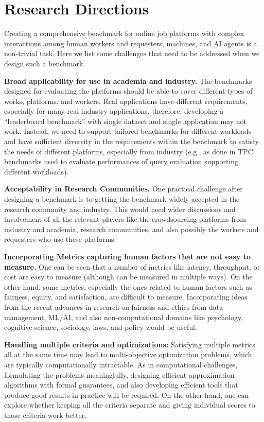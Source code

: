 \section{Research Directions}\label{sec:research}

Creating a comprehensive benchmark for online job platforms with complex interactions among human workers and requesters, machines, and AI agents is a non-trivial task. Here we list some challenges that need to be addressed when we design such a benchmark.


\textbf{Broad applicability for use in academia and industry.} The benchmarks designed for evaluating the platforms should be able to cover  different types of works, platforms, and workers.  Real applications have different requirements, especially for many real industry applications, therefore, developing a ``leaderboard benchmark'' with single dataset and single application may not work. Instead, we need to support tailored benchmarks for different workloads and have sufficient diversity in the requirements within the benchmark to  satisfy the needs of different platforms, especially from industry (e.g., as done in TPC benchmarks used to evaluate performances of query evaluation supporting different workloads).

\textbf{Acceptability in Research Communities.} One practical challenge after designing a benchmark is to getting the benchmark widely  accepted in the research community and industry. This would need wider discussions and involvement  of all the relevant players like the crowdsourcing platforms from industry  and academia, research communities, and also possibly the workers and requesters who use these platforms.


\textbf{Incorporating Metrics capturing human factors that are not easy to measure.}
One can be seen that a number of metrics like latency, throughput, or cost are easy to measure (although can be measured in multiple ways). On the other hand, some metrics, especially the ones related to human factors such as fairness, equity, and satisfaction, are difficult to measure. Incorporating ideas from the recent advances in research on  fairness and ethics from data management, ML/AI, and also non-computational domains like psychology, cognitive science, sociology, laws, and policy would be useful.

\textbf{Handling multiple criteria and optimizations:} Satisfying multiple metrics all at the same time may lead to multi-objective optimization problems, which are typically computationally intractable. As in computational challenges, formulating the problems meaningfully, designing efficient approximation algorithms with formal guarantees, and also developing efficient tools that produce good results in practice will be required. On the other hand, one can explore whether keeping all the criteria separate and giving individual scores to those criteria work better.

